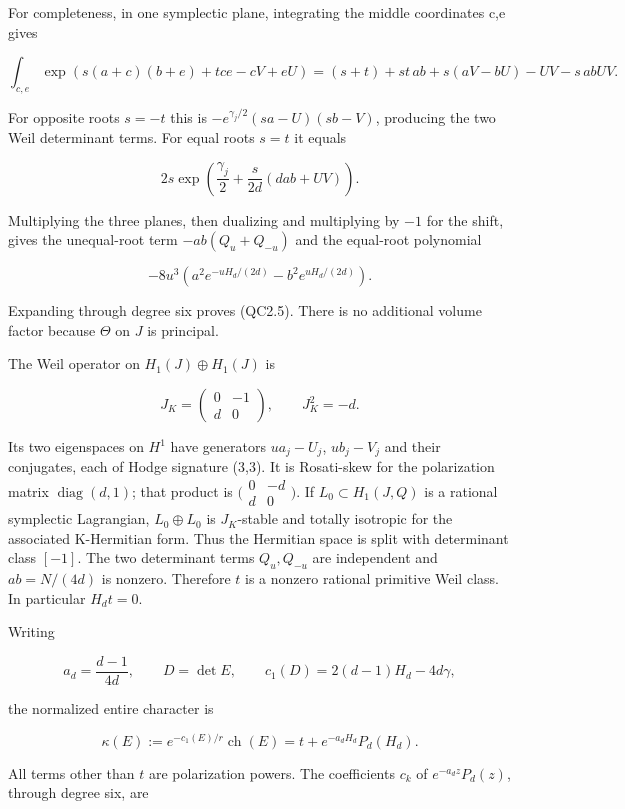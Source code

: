 For completeness, in one symplectic plane, integrating the middle
coordinates c,e gives

\[
 \int_{c,e}\exp(s(a+c)(b+e)+tce-cV+eU)
  =(s+t)+st\,ab+s(aV-bU)-UV-s\,abUV.
\]

For opposite roots \(s=-t\) this is \(-e^{\gamma _j/2}(sa-U)(sb-V)\),
producing the two Weil determinant terms. For equal roots \(s=t\) it
equals

\[
 2s\exp\left(\frac{\gamma_j}{2}+\frac{s}{2d}(d a b+UV)\right).
\]

Multiplying the three planes, then dualizing and multiplying by \(-1\)
for the shift, gives the unequal-root term \(-ab(Q_u+Q_{-u})\) and the
equal-root polynomial

\[
 -8u^3\left(a^2e^{-uH_d/(2d)}-b^2e^{uH_d/(2d)}\right).
\]

Expanding through degree six proves (QC2.5). There is no additional
volume factor because \(\Theta\) on \(J\) is principal.

The Weil operator on \(H_{1}(J)\oplus H_{1}(J)\) is

\[
 J_K=\begin{pmatrix}0&-1\\d&0\end{pmatrix},\qquad J_K^2=-d.
\]

Its two eigenspaces on \(H^{1}\) have generators \(ua_j-U_j\),
\(ub_j-V_j\) and their conjugates, each of Hodge signature (3,3). It is
Rosati-skew for the polarization matrix \(\operatorname{diag}(d,1)\);
that product is
\(\bigl(\begin{smallmatrix}0&-d\\d&0\end{smallmatrix}\bigr)\). If
\(L_{0}\subset H_{1}(J,Q)\) is a rational symplectic Lagrangian,
\(L_{0}\oplus L_{0}\) is \(J_K\)-stable and totally isotropic for the
associated K-Hermitian form. Thus the Hermitian space is split with
determinant class \([-1]\). The two determinant terms \(Q_u,Q_{-u}\) are
independent and \(ab=N/(4d)\) is nonzero. Therefore \(t\) is a nonzero
rational primitive Weil class. In particular \(H_d t=0\).

Writing

\[
 a_d=\frac{d-1}{4d},\qquad
 D=\det E,\qquad c_1(D)=2(d-1)H_d-4d\gamma,
\]

the normalized entire character is

\[
 \kappa(E):=e^{-c_1(E)/r}\operatorname{ch}(E)
 =t+e^{-a_dH_d}P_d(H_d).
 \tag{QC2.6}
\]

All terms other than \(t\) are polarization powers. The coefficients
\(c_k\) of \(e^{-a_d z}P_d(z)\), through degree six, are

